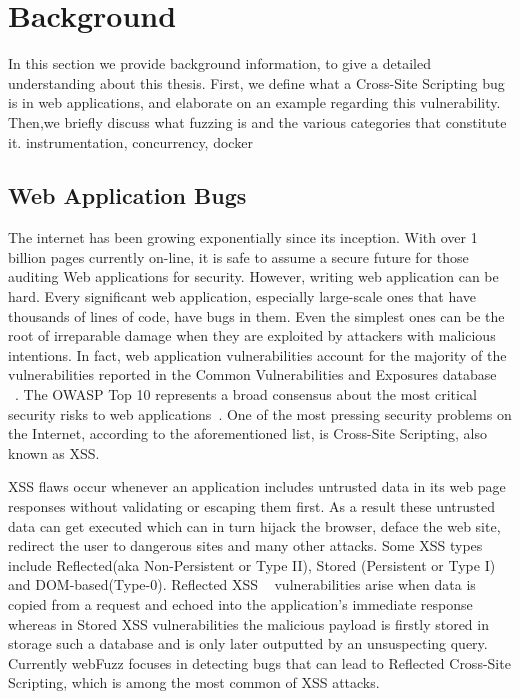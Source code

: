\chapter{Background}
\label{sec:background}
\minitoc
\vspace*{1cm}

In this section we provide background information, to give a detailed understanding about this thesis. First, we define what a Cross-Site Scripting bug is in web applications, and elaborate on an example regarding this vulnerability. Then,we briefly discuss what fuzzing is and the various categories that constitute it. instrumentation, concurrency, docker

\section{Web Application Bugs}
The internet has been growing exponentially since its inception. With over 1 billion
pages currently on-line, it is safe to assume a secure future for those auditing
Web applications for security. However, writing web application can be hard. Every significant web application, especially large-scale ones that have thousands of lines of code, have bugs in them. Even the simplest ones can be the root of irreparable damage when they are exploited by attackers with malicious intentions. In fact, web application vulnerabilities account for the majority of the vulnerabilities reported in the Common Vulnerabilities and Exposures database ~\cite{cve}. The OWASP Top 10 represents a broad consensus about the most critical security risks to web applications~\cite{owasp2017}. One of the most pressing security problems on the Internet, according to the aforementioned list, is Cross-Site Scripting, also known as XSS.

XSS flaws occur whenever an application includes untrusted data in its web page responses without validating or escaping them first. As a result these untrusted data can get executed which can in turn hijack the browser, deface the web site, redirect the user to dangerous sites and many other attacks. Some XSS types include Reflected(aka Non-Persistent or Type II), Stored (Persistent or Type I) and DOM-based(Type-0).
Reflected XSS ~\cite{rxss_def} vulnerabilities arise when data is copied from a request and echoed into the application’s immediate response whereas in Stored XSS vulnerabilities the malicious payload is firstly stored in storage such a database and is only later outputted by an unsuspecting query.
Currently webFuzz focuses in detecting bugs that can lead to Reflected Cross-Site Scripting, which is among the most common of XSS attacks.

